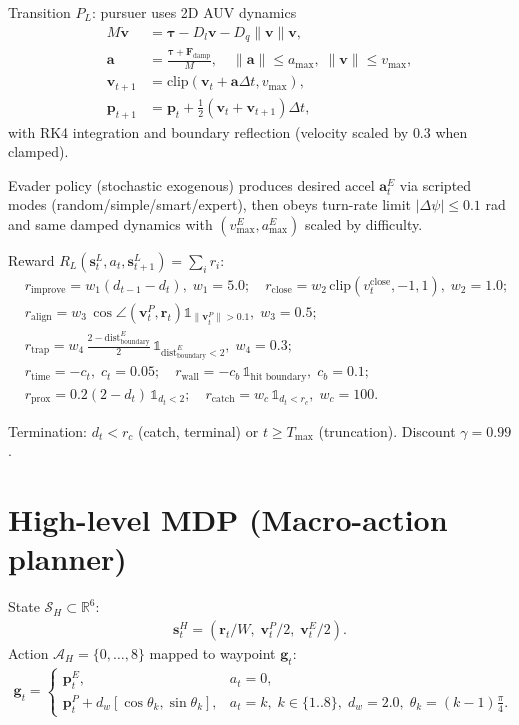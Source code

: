 \documentclass[11pt]{article}
\begin{document}
Transition $P_L$: pursuer uses 2D AUV dynamics
\begin{align*}
M \dot{\bm{v}} &= \bm{\tau} - D_l \bm{v} - D_q \|\bm{v}\|\bm{v},\\
\bm{a} &= \frac{\bm{\tau} + \bm{F}_{\text{damp}}}{M},\quad \|\bm{a}\|\le a_{\max},\; \|\bm{v}\|\le v_{\max},\\
\bm{v}_{t+1} &= \text{clip}(\bm{v}_t + \bm{a}\Delta t, v_{\max}),\\
\bm{p}_{t+1} &= \bm{p}_t + \tfrac{1}{2}(\bm{v}_t+\bm{v}_{t+1})\Delta t,
\end{align*}
with RK4 integration and boundary reflection (velocity scaled by $0.3$ when clamped).

Evader policy (stochastic exogenous) produces desired accel $\bm{a}^E_t$ via scripted modes (random/simple/smart/expert), then obeys turn-rate limit $|\Delta\psi|\le 0.1$ rad and same damped dynamics with $(v^E_{\max}, a^E_{\max})$ scaled by difficulty.

Reward $R_L(\bm{s}^L_t,a_t,\bm{s}^L_{t+1})=\sum_i r_i$:
\begin{align*}
&r_{\text{improve}} = w_1(d_{t-1}-d_t),\; w_1=5.0;\quad r_{\text{close}} = w_2\,\text{clip}(v^{\text{close}}_t,-1,1),\; w_2=1.0;\\
&r_{\text{align}} = w_3\, \cos\angle(\bm{v}^P_t,\bm{r}_t)\mathbb{1}_{\|\bm{v}^P_t\|>0.1},\; w_3=0.5;\\
&r_{\text{trap}} = w_4\,\tfrac{2-\text{dist}^E_{\text{boundary}}}{2}\, \mathbb{1}_{\text{dist}^E_{\text{boundary}}<2},\; w_4=0.3;\\
&r_{\text{time}} = -c_t,\; c_t=0.05;\quad r_{\text{wall}}=-c_b\,\mathbb{1}_{\text{hit boundary}},\; c_b=0.1;\\
&r_{\text{prox}} = 0.2(2-d_t)\,\mathbb{1}_{d_t<2};\quad r_{\text{catch}} = w_c\,\mathbb{1}_{d_t<r_c},\; w_c=100.
\end{align*}

Termination: $d_t<r_c$ (catch, terminal) or $t\ge T_{\max}$ (truncation). Discount $\gamma=0.99$.

\section{High-level MDP (Macro-action planner)}
State $\mathcal{S}_H\subset\mathbb{R}^6$:
\begin{align*}
\bm{s}^H_t = (\bm{r}_t/W,\; \bm{v}^P_t/2,\; \bm{v}^E_t/2).
\end{align*}
Action $\mathcal{A}_H=\{0,\dots,8\}$ mapped to waypoint $\bm{g}_t$:
\begin{align*}
\bm{g}_t = \begin{cases}
\bm{p}^E_t, & a_t=0,\\
\bm{p}^P_t + d_w[\cos\theta_k,\sin\theta_k], & a_t=k,\; k\in\{1..8\},\; d_w=2.0,\; \theta_k=(k-1)\tfrac{\pi}{4}.
\end{cases}
\end{align*}
\end{document}
